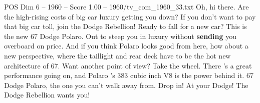 \begin{textsample}{POS Dim 6 – 1960 – Score 1.00 – 1960/tv\_com\_1960\_33.txt}  \label{ex:f6_pos_023}
Oh, hi there.
Are the high-rising costs of big car luxury getting you down?
If you don't want to pay that big car toll, join the Dodge Rebellion!
Ready to fall for a new car?
This is the new 67 Dodge Polaro.
Out to steep you in luxury without \textbf{sending} you overboard on price.
And if you think Polaro looks good from here, how about a new perspective, where the taillight and rear deck have to be the hot new architecture of 67.
Want another point of view?
Take the wheel.
There 's a great performance going on, and Polaro 's 383 cubic inch V8 is the power behind it. 67 Dodge Polaro, the one you can't walk away from.
Drop in!
At your Dodge!
The Dodge Rebellion wants you!

\end{textsample}
